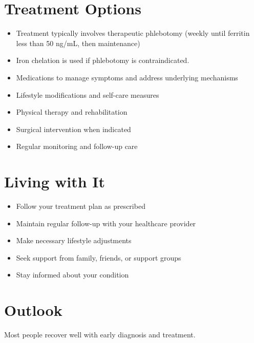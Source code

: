 \section{Treatment Options}
\begin{itemize}[noitemsep]
  \item Treatment typically involves therapeutic phlebotomy (weekly until ferritin less than 50 ng/mL, then maintenance)
  \item Iron chelation is used if phlebotomy is contraindicated.
  \item Medications to manage symptoms and address underlying mechanisms
  \item Lifestyle modifications and self-care measures
  \item Physical therapy and rehabilitation
  \item Surgical intervention when indicated
  \item Regular monitoring and follow-up care
\end{itemize}
\section{Living with It}
\begin{itemize}[noitemsep]
  \item Follow your treatment plan as prescribed
  \item Maintain regular follow-up with your healthcare provider
  \item Make necessary lifestyle adjustments
  \item Seek support from family, friends, or support groups
  \item Stay informed about your condition
\end{itemize}
\section{Outlook}
Most people recover well with early diagnosis and treatment.
